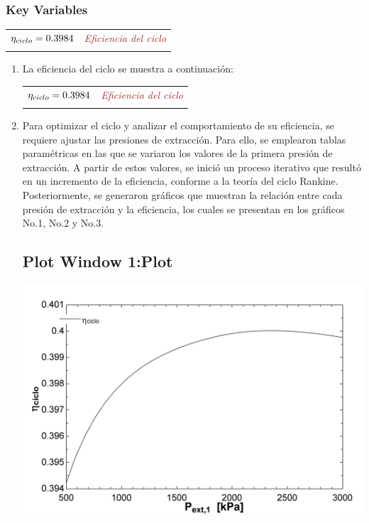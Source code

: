 \documentclass[10pt,fleqn]{article}
\theoremstyle{mytheoremstyle}
\theoremstyle{mytheoremstyle}
\theoremstyle{myproblemstyle}
\begin{document}
\subsubsection*{Key Variables}
\vspace{-0.18 in}
\setlength\LTleft{0pt}
\setlength\LTright{0pt}
\begin{longtable}{ll}
${\eta_{ciclo} =0.3984 \rm}$ & 
\it \textcolor{brown}{Eficiencia del ciclo } \\
\it \textcolor{brown}{} \\
\end{longtable}
\newpage
\begin{enumerate}
    \item La eficiencia del ciclo se muestra a continuación:
    \vspace{0.18 in}
    \setlength\LTleft{0pt}
    \setlength\LTright{0pt}
    \begin{longtable}{ll}
    ${\eta_{ciclo} =0.3984 \rm}$ & 
    \it \textcolor{brown}{Eficiencia del ciclo } \\
    \it \textcolor{brown}{} \\
    \end{longtable}
    
    \item
    Para optimizar el ciclo y analizar el comportamiento de su eficiencia, se requiere ajustar las presiones de extracción. Para ello, se emplearon tablas paramétricas en las que se variaron los valores de la primera presión de extracción. A partir de estos valores, se inició un proceso iterativo que resultó en un incremento de la eficiencia, conforme a la teoría del ciclo Rankine. Posteriormente, se generaron gráficos que muestran la relación entre cada presión de extracción y la eficiencia, los cuales se presentan en los gráficos No.1, No.2 y No.3.
    \subsection*{Plot Window 1:\;Plot}
    {\centerline{\includegraphics[width=5.0in,keepaspectratio]{Taller2_P2.jpg}}}

\end{enumerate}
\end{document}
